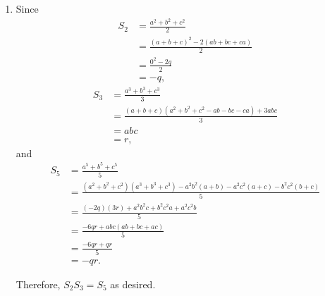 \begin{enumerate}
    \item Since
          \begin{align*}
              S_2 & = \frac{a^2 + b^2 + c^2}{2}                 \\
                  & = \frac{(a + b + c)^2 - 2(ab + bc + ca)}{2} \\
                  & = \frac{0^2 - 2q}{2}                        \\
                  & = -q,
          \end{align*}
          \begin{align*}
              S_3 & = \frac{a^3 + b^3 + c^3}{3}                                    \\
                  & = \frac{(a + b + c)(a^2 + b^2 + c^2 - ab - bc - ca) + 3abc}{3} \\
                  & = abc                                                          \\
                  & = r,
          \end{align*}
          and
          \begin{align*}
              S_5 & = \frac{a^5 + b^5 + c^5}{5}                                                                        \\
                  & = \frac{(a^2 + b^2 + c^2)(a^3 + b^3 + c^3) - a^2b^2 (a + b) - a^2c^2 (a + c) - b^2 c^2 (b + c)}{5} \\
                  & = \frac{(-2q)(3r) + a^2 b^2 c + b^2 c^2 a + a^2 c^2 b}{5}                                          \\
                  & = \frac{-6qr + abc(ab + bc + ac)}{5}                                                               \\
                  & = \frac{-6qr + qr}{5}                                                                              \\
                  & = -qr.
          \end{align*}

          Therefore, \(S_2 S_3 = S_5\) as desired.


\end{enumerate}
